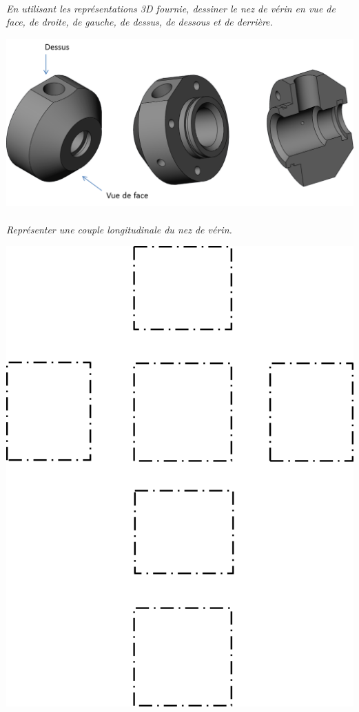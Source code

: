\documentclass[11pt,oneside]{article}
\begin{document}
\paragraph{}
\textit{En utilisant les représentations 3D fournie, dessiner le nez de vérin en vue de face, de droite, de gauche, de dessus, de dessous et de derrière.}

\begin{center}
\includegraphics[width=.9\textwidth]{png/fig4}
\end{center}

\paragraph{}
\textit{Représenter une couple longitudinale du nez de vérin.}

\begin{center}
\includegraphics[width=16cm]{png/fig5}
\end{center}
\end{document}
